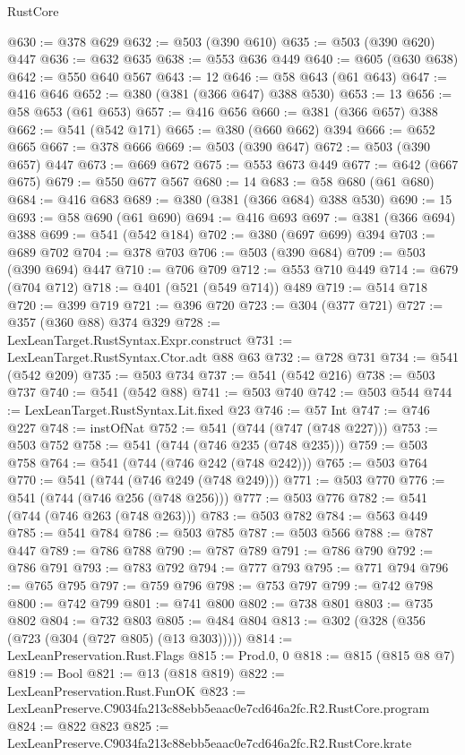 \begin{lexlean}{RustCore}
\begin{coremodule}
@630 := @378 @629
@632 := @503 (@390 @610)
@635 := @503 (@390 @620) @447
@636 := @632 @635
@638 := @553 @636 @449
@640 := @605 (@630 @638)
@642 := @550 @640 @567
@643 := 12
@646 := @58 @643 (@61 @643)
@647 := @416 @646
@652 := @380 (@381 (@366 @647) @388 @530)
@653 := 13
@656 := @58 @653 (@61 @653)
@657 := @416 @656
@660 := @381 (@366 @657) @388
@662 := @541 (@542 @171)
@665 := @380 (@660 @662) @394
@666 := @652 @665
@667 := @378 @666
@669 := @503 (@390 @647)
@672 := @503 (@390 @657) @447
@673 := @669 @672
@675 := @553 @673 @449
@677 := @642 (@667 @675)
@679 := @550 @677 @567
@680 := 14
@683 := @58 @680 (@61 @680)
@684 := @416 @683
@689 := @380 (@381 (@366 @684) @388 @530)
@690 := 15
@693 := @58 @690 (@61 @690)
@694 := @416 @693
@697 := @381 (@366 @694) @388
@699 := @541 (@542 @184)
@702 := @380 (@697 @699) @394
@703 := @689 @702
@704 := @378 @703
@706 := @503 (@390 @684)
@709 := @503 (@390 @694) @447
@710 := @706 @709
@712 := @553 @710 @449
@714 := @679 (@704 @712)
@718 := @401 (@521 (@549 @714)) @489
@719 := @514 @718
@720 := @399 @719
@721 := @396 @720
@723 := @304 (@377 @721)
@727 := @357 (@360 @88) @374 @329
@728 := LexLeanTarget.RustSyntax.Expr.construct
@731 := LexLeanTarget.RustSyntax.Ctor.adt @88 @63
@732 := @728 @731
@734 := @541 (@542 @209)
@735 := @503 @734
@737 := @541 (@542 @216)
@738 := @503 @737
@740 := @541 (@542 @88)
@741 := @503 @740
@742 := @503 @544
@744 := LexLeanTarget.RustSyntax.Lit.fixed @23
@746 := @57 Int
@747 := @746 @227
@748 := instOfNat
@752 := @541 (@744 (@747 (@748 @227)))
@753 := @503 @752
@758 := @541 (@744 (@746 @235 (@748 @235)))
@759 := @503 @758
@764 := @541 (@744 (@746 @242 (@748 @242)))
@765 := @503 @764
@770 := @541 (@744 (@746 @249 (@748 @249)))
@771 := @503 @770
@776 := @541 (@744 (@746 @256 (@748 @256)))
@777 := @503 @776
@782 := @541 (@744 (@746 @263 (@748 @263)))
@783 := @503 @782
@784 := @563 @449
@785 := @541 @784
@786 := @503 @785
@787 := @503 @566
@788 := @787 @447
@789 := @786 @788
@790 := @787 @789
@791 := @786 @790
@792 := @786 @791
@793 := @783 @792
@794 := @777 @793
@795 := @771 @794
@796 := @765 @795
@797 := @759 @796
@798 := @753 @797
@799 := @742 @798
@800 := @742 @799
@801 := @741 @800
@802 := @738 @801
@803 := @735 @802
@804 := @732 @803
@805 := @484 @804
@813 := @302 (@328 (@356 (@723 (@304 (@727 @805) (@13 @303)))))
@814 := LexLeanPreservation.Rust.Flags
@815 := Prod.{0, 0}
@818 := @815 (@815 @8 @7)
@819 := Bool
@821 := @13 (@818 @819)
@822 := LexLeanPreservation.Rust.FunOK
@823 := LexLeanPreserve.C9034fa213c88ebb5eaac0e7cd646a2fc.R2.RustCore.program
@824 := @822 @823
@825 := LexLeanPreserve.C9034fa213c88ebb5eaac0e7cd646a2fc.R2.RustCore.krate

\end{coremodule}
\end{lexlean}
